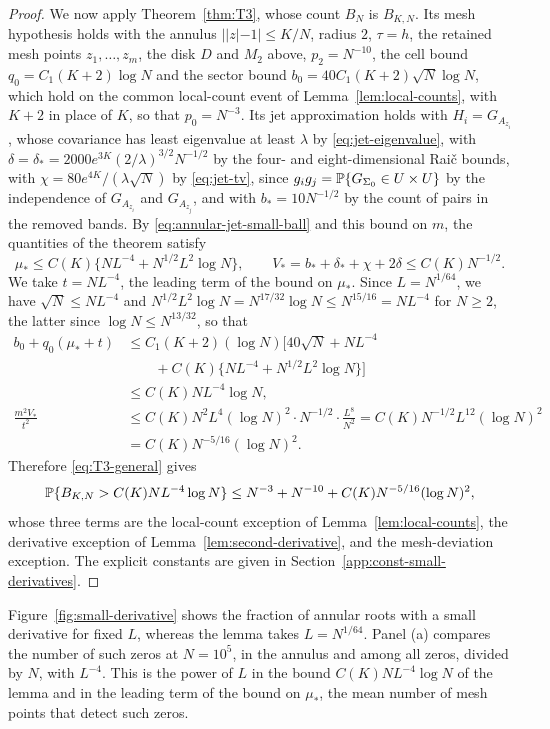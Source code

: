 \begin{proof}
We now apply Theorem~\ref{thm:T3}, whose count $B_N$ is $B_{K,N}$. Its
mesh hypothesis holds with the annulus $||z|-1|\le K/N$, radius $2$, $\tau=h$,
the retained mesh points $z_1,\ldots,z_m$, the disk $D$ and $M_2$ above,
$p_2=N^{-10}$, the cell bound $q_0=C_1(K+2)\log N$ and the sector bound
$b_0=40C_1(K+2)\sqrt N\log N$, which hold on the common local-count event
of Lemma~\ref{lem:local-counts}, with $K+2$ in place of $K$, so that
$p_0=N^{-3}$. Its jet approximation holds with $H_i=G_{A_{z_i}}$, whose
covariance has least eigenvalue at least $\lambda$ by
\eqref{eq:jet-eigenvalue}, with
$\delta=\delta_*=2000e^{3K}(2/\lambda)^{3/2}N^{-1/2}$ by the four- and
eight-dimensional Rai\v{c} bounds, with $\chi=80e^{4K}/(\lambda\sqrt N)$
by \eqref{eq:jet-tv}, since $g_ig_j=\mathbb P\{G_{\Sigma_0}\in U\times U\}$ by
the independence of $G_{A_{z_i}}$ and $G_{A_{z_j}}$, and with
$b_*=10N^{-1/2}$ by the count of pairs in the removed bands.
By \eqref{eq:annular-jet-small-ball} and this bound on $m$, the
quantities of the theorem satisfy
\[
 \mu_*\le C(K)\{NL^{-4}+N^{1/2}L^2\log N\},\qquad
 V_*=b_*+\delta_*+\chi+2\delta\le C(K)N^{-1/2}.
\]
We take $t=NL^{-4}$, the leading term of the bound on $\mu_*$. Since
$L=N^{1/64}$, we have $\sqrt N\le NL^{-4}$ and
$N^{1/2}L^2\log N=N^{17/32}\log N\le N^{15/16}=NL^{-4}$ for $N\ge2$, the
latter since $\log N\le N^{13/32}$, so that
\begin{align*}
 b_0+q_0(\mu_*+t)
 &\le C_1(K+2)(\log N)\bigl[40\sqrt N+NL^{-4}\\
 &\qquad+C(K)\{NL^{-4}+N^{1/2}L^2\log N\}\bigr]\\
 &\le C(K)NL^{-4}\log N,\\
 \frac{m^2V_*}{t^2}
 &\le C(K)N^2L^4(\log N)^2\cdot N^{-1/2}\cdot\frac{L^8}{N^2}
 =C(K)N^{-1/2}L^{12}(\log N)^2\\
 &=C(K)N^{-5/16}(\log N)^2.
\end{align*}
Therefore \eqref{eq:T3-general} gives
\begin{equation}
 \mathbb P\{B_{K,N}>C(K)NL^{-4}\log N\}
 \le N^{-3}+N^{-10}+C(K)N^{-5/16}(\log N)^2,
 \label{eq:annular-small-derivatives}
\end{equation}
whose three terms are the local-count exception of
Lemma~\ref{lem:local-counts}, the derivative exception of
Lemma~\ref{lem:second-derivative}, and the mesh-deviation exception.
The explicit constants are given in
Section~\ref{app:const-small-derivatives}.
\end{proof}

Figure~\ref{fig:small-derivative} shows the fraction of annular roots with
a small derivative for fixed $L$, whereas the lemma takes $L=N^{1/64}$.
Panel (a) compares the number of such zeros at $N=10^5$, in the annulus
and among all zeros, divided by $N$, with $L^{-4}$. This is the power of
$L$ in the bound $C(K)NL^{-4}\log N$ of the lemma and in the leading term
of the bound on $\mu_*$, the mean number of mesh points that detect such
zeros.

